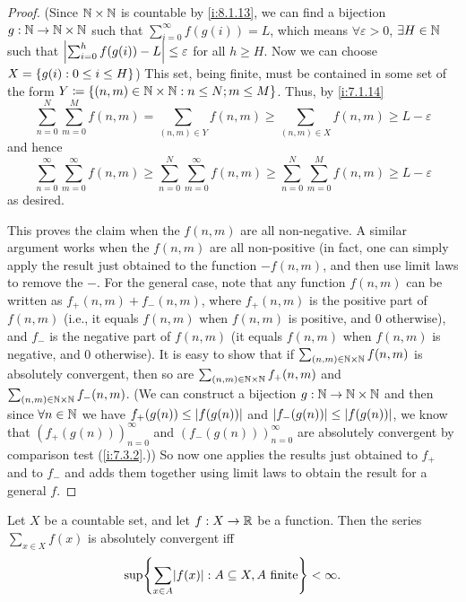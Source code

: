 \begin{proof}
  (Since \(\mathbb{N} \times \mathbb{N}\) is countable by \cref{i:8.1.13}, we can find a bijection \(g : \mathbb{N} \to \mathbb{N} \times \mathbb{N}\) such that \(\sum_{i = 0}^\infty f(g(i)) = L\), which means \(\forall \varepsilon > 0\), \(\exists H \in \mathbb{N}\) such that \(\left\lvert\sum_{i = 0}^h f(g(i)) - L\right\rvert \leq \varepsilon\) for all \(h \geq H\).
  Now we can choose \(X = \left\lbrace g(i) : 0 \leq i \leq H\right\rbrace\))
  This set, being finite, must be contained in some set of the form \(Y \coloneqq \left\lbrace(n,m) \in \mathbb{N} \times \mathbb{N} : n \leq N; m \leq M \right\rbrace\).
  Thus, by \cref{i:7.1.14}
  \[
    \sum_{n = 0}^N \sum_{m = 0}^M f(n, m) = \sum_{(n, m) \in Y} f(n, m) \geq \sum_{(n, m) \in X} f(n, m) \geq L - \varepsilon
  \]
  and hence
  \[
    \sum_{n = 0}^\infty \sum_{m = 0}^\infty f(n, m) \geq \sum_{n = 0}^N \sum_{m = 0}^\infty f(n, m) \geq \sum_{n = 0}^N \sum_{m = 0}^M f(n, m) \geq L - \varepsilon
  \]
  as desired.

  This proves the claim when the \(f(n, m)\) are all non-negative.
  A similar argument works when the \(f(n, m)\) are all non-positive
  (in fact, one can simply apply the result just obtained to the function \(-f(n, m)\), and then use limit laws to remove the \(-\).
  For the general case, note that any function \(f(n, m)\) can be written as \(f_+(n, m) + f_-(n, m)\), where \(f_+(n, m)\) is the positive part of \(f(n, m)\)
  (i.e., it equals \(f(n, m)\) when \(f(n, m)\) is positive, and \(0\) otherwise),
  and \(f_-\) is the negative part of \(f(n, m)\)
  (it equals \(f(n, m)\) when \(f(n, m)\) is negative, and \(0\) otherwise).
  It is easy to show that if \(\sum_{(n, m) \in \mathbb{N} \times \mathbb{N}} f(n, m)\) is absolutely convergent, then so are \(\sum_{(n, m) \in \mathbb{N} \times \mathbb{N}} f_+(n, m)\) and \(\sum_{(n, m) \in \mathbb{N} \times \mathbb{N}} f_-(n, m)\).
  (We can construct a bijection \(g : \mathbb{N} \to \mathbb{N} \times \mathbb{N}\) and then since \(\forall n \in \mathbb{N}\) we have \(f_+(g(n)) \leq \left\lvert f(g(n))\right\rvert\) and \(\left\lvert f_-(g(n))\right\rvert \leq \left\lvert f(g(n))\right\rvert\), we know that \((f_+(g(n)))_{n = 0}^\infty\) and \((f_-(g(n)))_{n = 0}^\infty\) are absolutely convergent by comparison test (\cref{i:7.3.2}.))
  So now one applies the results just obtained to \(f_+\) and to \(f_-\) and adds them together using limit laws to obtain the result for a general \(f\).
\end{proof}

\begin{lem}\label{i:8.2.3}
  Let \(X\) be a countable set, and let \(f : X \to \mathbb{R}\) be a function.
  Then the series \(\sum_{x \in X} f(x)\) is absolutely convergent iff
  \[
    \sup\set{\sum_{x \in A} \abs{f(x)} : A \subseteq X, A \text{ finite}} < \infty.
  \]
\end{lem}

